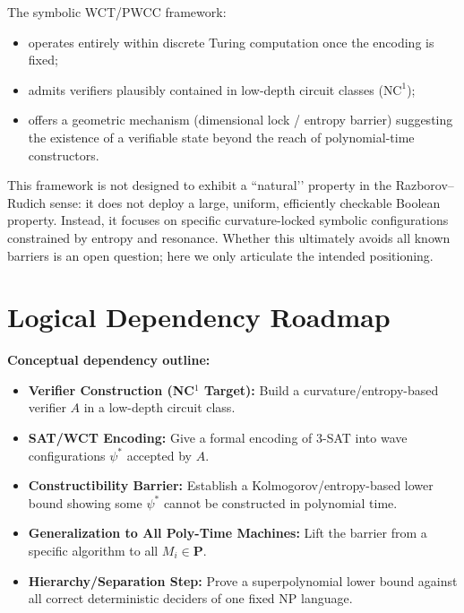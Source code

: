 \documentclass[12pt]{article}
\theoremstyle{remark}
\begin{document}
The symbolic WCT/PWCC framework:

\begin{itemize}
  \item operates entirely within discrete Turing computation once the encoding is fixed;
  \item admits verifiers plausibly contained in low-depth circuit classes (\(\text{NC}^1\));
  \item offers a geometric mechanism (dimensional lock / entropy barrier) suggesting the
        existence of a verifiable state beyond the reach of polynomial-time constructors.
\end{itemize}

\begin{tcolorbox}[colback=gray!5!white, colframe=black, title=Natural-Proof Barrier Positioning]
This framework is not designed to exhibit a “natural’’ property in the Razborov–Rudich sense:
it does not deploy a large, uniform, efficiently checkable Boolean property.
Instead, it focuses on specific curvature-locked symbolic configurations constrained by
entropy and resonance.  
Whether this ultimately avoids all known barriers is an open question; here we only
articulate the intended positioning.
\end{tcolorbox}












\section*{Logical Dependency Roadmap}

\textbf{Conceptual dependency outline:}
\begin{itemize}
  \item \textbf{Verifier Construction (NC\(^1\) Target):} Build a curvature/entropy-based verifier \(A\) in a low-depth circuit class.
  \item \textbf{SAT/WCT Encoding:} Give a formal encoding of 3-SAT into wave configurations \(\psi^*\) accepted by \(A\).
  \item \textbf{Constructibility Barrier:} Establish a Kolmogorov/entropy-based lower bound showing some \(\psi^*\) cannot be constructed in polynomial time.
  \item \textbf{Generalization to All Poly-Time Machines:} Lift the barrier from a specific algorithm to all \( M_i \in \mathbf{P} \).
  \item \textbf{Hierarchy/Separation Step:} Prove a superpolynomial lower bound against all correct deterministic deciders of one fixed NP language.
\end{itemize}
\end{document}
